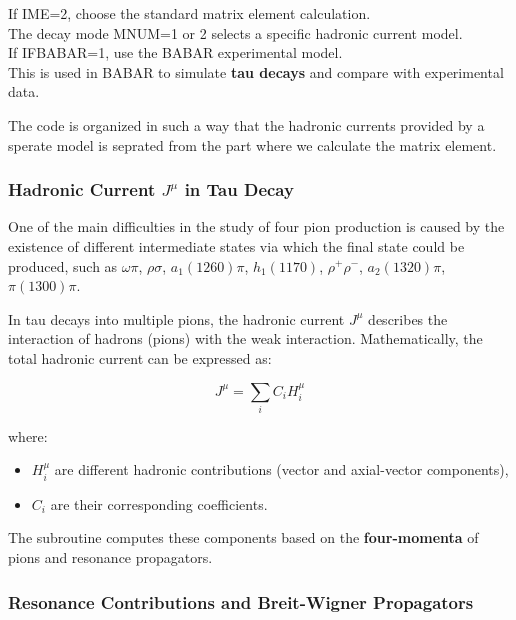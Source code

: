 \documentclass[12pt]{article}
\begin{document}
If IME=2, choose the standard matrix element calculation.\\


The decay mode MNUM=1 or 2 selects a specific hadronic current model.\\

If IFBABAR=1, use the BABAR experimental model.\\

This is used in BABAR to simulate \textbf{tau decays} and compare with experimental data.


The code is organized in such a way that the hadronic currents provided by a sperate model is seprated from the part where we calculate the matrix element. 

\subsubsection{Hadronic Current \( J^\mu \) in Tau Decay}


One of the main difficulties in the study of four pion production is caused by the
existence of different intermediate states via which the final state could be produced, such
as \(\omega \pi\), \(\rho \sigma\), \(a_1(1260)\pi\), \(h_1(1170)\), \(\rho^+ \rho^- \), \(a_2(1320)\pi\), \(\pi(1300)\pi\).


In tau decays into multiple pions, the hadronic current \( J^\mu \) describes the interaction of hadrons (pions) with the weak interaction. Mathematically, the total hadronic current can be expressed as:

\begin{equation}
J^\mu = \sum_i C_i H_i^\mu
\end{equation}

where:
\begin{itemize}
    \item \( H_i^\mu \) are different hadronic contributions (vector and axial-vector components),
    \item \( C_i \) are their corresponding coefficients.
\end{itemize}

The subroutine computes these components based on the \textbf{four-momenta} of pions and resonance propagators.

\subsubsection{Resonance Contributions and Breit-Wigner Propagators}
\end{document}
